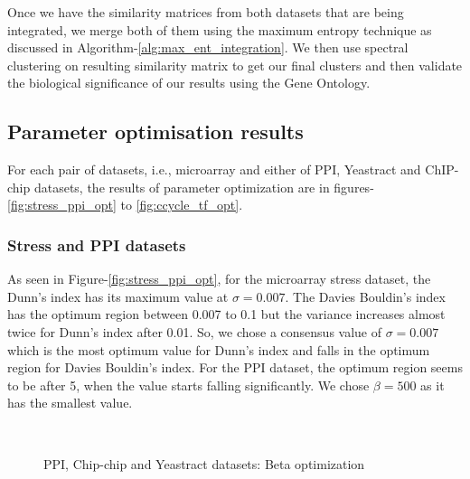 Once we have the similarity matrices from both datasets that are being integrated, we merge both of them using the maximum entropy technique as discussed in Algorithm-\ref{alg:max_ent_integration}. We then use spectral clustering on resulting similarity matrix to get our final clusters and then validate the biological significance of our results using the Gene Ontology.

\subsection{Parameter optimisation results}\label{param_optimisation}
For each pair of datasets, i.e., microarray and either of PPI, Yeastract and ChIP-chip datasets, the results of parameter optimization are in figures-\ref{fig:stress_ppi_opt} to \ref{fig:ccycle_tf_opt}. 
\subsubsection{Stress and PPI datasets}
As seen in Figure-\ref{fig:stress_ppi_opt}, for the microarray stress dataset, the Dunn's index has its maximum value at $\sigma=0.007$. The Davies Bouldin's index has the optimum region between 0.007 to 0.1 but the variance increases almost twice for Dunn's index after 0.01. So, we chose a consensus value of $\sigma=0.007$ which is the most optimum value for Dunn's index and falls in the optimum region for Davies Bouldin's index. For the PPI dataset, the optimum region seems to be after 5, when the value starts falling significantly. We chose $\beta=500$ as it has the smallest value.

\begin{figure}[htp]
  \begin{center}
     \\
  \end{center}
  \caption{PPI, Chip-chip and Yeastract datasets: Beta optimization}
  \label{fig:chip_ppi_yt_opt}
\end{figure}

